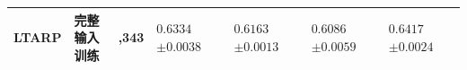 \begin{table}[!htbp]
\begin{tabularx}{\textwidth}{@{}>{\raggedright\arraybackslash}p{2.0cm}>{\centering\arraybackslash}p{2.5cm}>{\centering\arraybackslash}p{2.1cm}*{4}{>{\centering\arraybackslash}X}@{}}
\addlinespace\midrule
LTARP & \shortstack{完整输入\\训练} & 164,343 & \shortstack{$0.6334$\\$\pm0.0038$} & \shortstack{$0.6163$\\$\pm0.0013$} & \shortstack{$0.6086$\\$\pm0.0059$} & \shortstack{$0.6417$\\$\pm0.0024$}\\
\bottomrule
\end{tabularx}
\end{table}